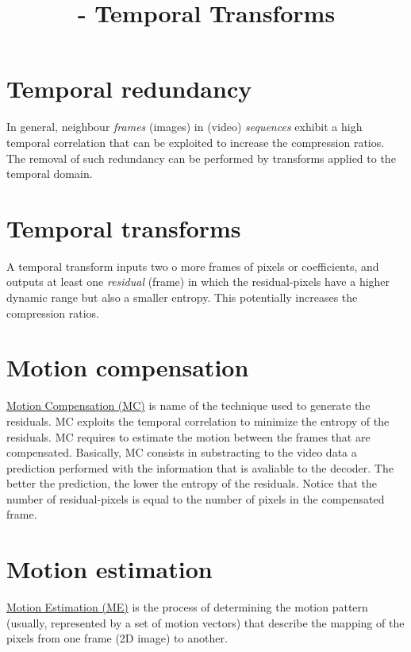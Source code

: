 

\title{\SM{} - Temporal Transforms}

\maketitle

\section{Temporal redundancy}

In general, neighbour \emph{frames} (images) in (video)
\emph{sequences} exhibit a high temporal correlation that can be
exploited to increase the compression ratios. The removal of such
redundancy can be performed by transforms applied to the temporal
domain.

\section{Temporal transforms}

A temporal transform inputs two o more frames of pixels or
coefficients, and outputs at least one \emph{residual} (frame) in
which the residual-pixels have a higher dynamic range but also a
smaller entropy. This potentially increases the compression ratios.

\section{Motion compensation}
\href{https://en.wikipedia.org/wiki/Motion_compensation}{Motion
  Compensation (MC)} is name of the technique used to generate the
residuals. MC exploits the temporal correlation to minimize the
entropy of the residuals. MC requires to estimate the motion between
the frames that are compensated. Basically, MC consists in
substracting to the video data a prediction performed with the
information that is avaliable to the decoder. The better the
prediction, the lower the entropy of the residuals. Notice that the
number of residual-pixels is equal to the number of pixels in the
compensated frame.

\section{Motion estimation}
\href{https://en.wikipedia.org/wiki/Motion_estimation}{Motion
  Estimation (ME)} is the process of determining the motion pattern
(usually, represented by a set of motion vectors) that describe the
mapping of the pixels from one frame (2D image) to another.

